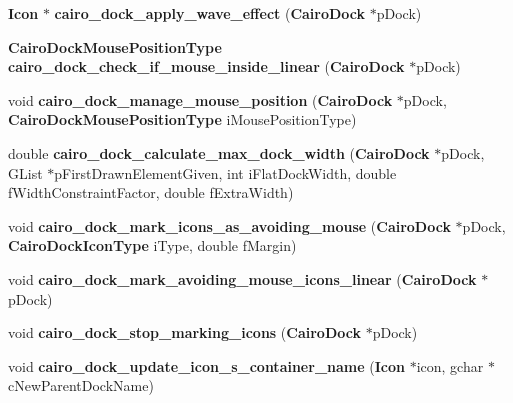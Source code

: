 \begin{CompactItemize}
\item 
{\bf Icon} $\ast$ {\bf cairo\_\-dock\_\-apply\_\-wave\_\-effect} ({\bf Cairo\-Dock} $\ast$p\-Dock)
\item 
{\bf Cairo\-Dock\-Mouse\-Position\-Type} {\bf cairo\_\-dock\_\-check\_\-if\_\-mouse\_\-inside\_\-linear} ({\bf Cairo\-Dock} $\ast$p\-Dock)
\item 
void {\bf cairo\_\-dock\_\-manage\_\-mouse\_\-position} ({\bf Cairo\-Dock} $\ast$p\-Dock, {\bf Cairo\-Dock\-Mouse\-Position\-Type} i\-Mouse\-Position\-Type)
\item 
double {\bf cairo\_\-dock\_\-calculate\_\-max\_\-dock\_\-width} ({\bf Cairo\-Dock} $\ast$p\-Dock, GList $\ast$p\-First\-Drawn\-Element\-Given, int i\-Flat\-Dock\-Width, double f\-Width\-Constraint\-Factor, double f\-Extra\-Width)
\item 
void {\bf cairo\_\-dock\_\-mark\_\-icons\_\-as\_\-avoiding\_\-mouse} ({\bf Cairo\-Dock} $\ast$p\-Dock, {\bf Cairo\-Dock\-Icon\-Type} i\-Type, double f\-Margin)
\item 
void {\bf cairo\_\-dock\_\-mark\_\-avoiding\_\-mouse\_\-icons\_\-linear} ({\bf Cairo\-Dock} $\ast$p\-Dock)
\item 
void {\bf cairo\_\-dock\_\-stop\_\-marking\_\-icons} ({\bf Cairo\-Dock} $\ast$p\-Dock)
\item 
void {\bf cairo\_\-dock\_\-update\_\-icon\_\-s\_\-container\_\-name} ({\bf Icon} $\ast$icon, gchar $\ast$c\-New\-Parent\-Dock\-Name)
\end{CompactItemize}
